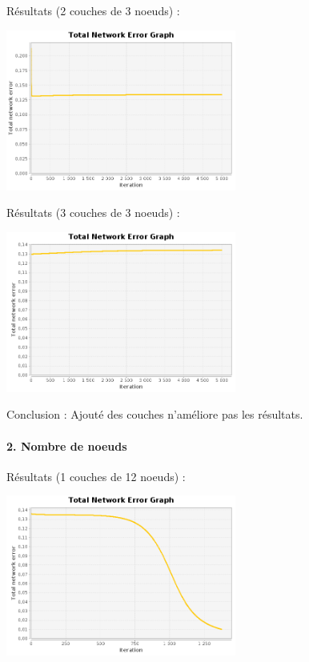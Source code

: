 \documentclass[10pt]{report}
\begin{document}
Résultats (2 couches de 3 noeuds) :\\
\begin{center}
\includegraphics[height=200px]{img/EQ_EG_4.png}\\
\end{center}

Résultats (3 couches de 3 noeuds) :\\
\begin{center}
\includegraphics[height=200px]{img/EQ_EG_5.png}\\
\end{center}

Conclusion : Ajouté des couches n'améliore pas les résultats.

\paragraph{2. Nombre de noeuds}

Résultats (1 couches de 12 noeuds) :\\
\begin{center}
\includegraphics[height=200px]{img/EQ_EG_6.png}\\
\end{center}
\end{document}
